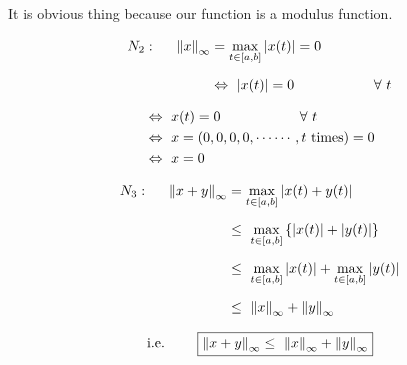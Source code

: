 \documentclass[a4paper,12pt]{article}
\begin{document}
    It is obvious thing because our function is a modulus function.

    \begin{center}
        \begin{equation*}
            \begin{split}
                N_2: \hspace*{0.5cm} \norm{x}_{\infty} & = \displaystyle \max_{t \in [a,b]} |x(t)| = 0\\[2mm]
                & \Leftrightarrow\  |x(t)| = 0 \hspace*{2cm} \forall\ t
            \end{split}
        \end{equation*}
    \end{center}

    \pagebreak

    \begin{center}
        \begin{equation*}
            \begin{split}
                & \Leftrightarrow\ x(t) = 0 \hspace*{2cm} \forall\ t\\
                & \Leftrightarrow\ x = (0,0,0,0,\cdots \cdots ,t\  \mbox{times}) = 0\\
                & \Leftrightarrow\ x = 0
            \end{split}
        \end{equation*}
    \end{center}

    \begin{equation*}
        \begin{split}
            N_3: \hspace*{0.5cm} \norm{x + y}_{\infty} & = \displaystyle \max_{t \in [a,b]} |x(t) + y(t)|\\[2mm]
            & \leq\ \displaystyle \max_{t \in [a,b]}\left\{ |x(t)| + |y(t)|\right\}\\[2mm]
            & \leq\ \displaystyle \max_{t \in [a,b]} |x(t)| + \displaystyle \max_{t \in [a,b]} |y(t)|\\[2mm]
            & \leq\ \norm{x}_{\infty} + \norm{y}_{\infty}
        \end{split}
    \end{equation*}

    \[\mbox{i.e.}\ \hspace*{0.7cm} \boxed{\norm{x + y}_{\infty} \leq\ \norm{x}_{\infty} + \norm{y}_{\infty}}\]
\end{document}
